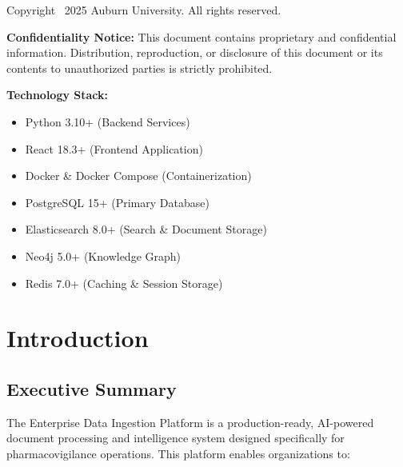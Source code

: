 \documentclass[11pt,a4paper,twoside]{book}
\begin{document}
\noindent
Copyright \textcopyright\ 2025 Auburn University. All rights reserved.

\vspace{1cm}

\noindent
\textbf{Confidentiality Notice:} This document contains proprietary and confidential information. Distribution, reproduction, or disclosure of this document or its contents to unauthorized parties is strictly prohibited.

\vspace{0.5cm}

\noindent
\textbf{Technology Stack:}
\begin{itemize}[noitemsep]
    \item Python 3.10+ (Backend Services)
    \item React 18.3+ (Frontend Application)
    \item Docker \& Docker Compose (Containerization)
    \item PostgreSQL 15+ (Primary Database)
    \item Elasticsearch 8.0+ (Search \& Document Storage)
    \item Neo4j 5.0+ (Knowledge Graph)
    \item Redis 7.0+ (Caching \& Session Storage)
\end{itemize}

\vspace*{\fill}

\tableofcontents
\listoffigures
\listoftables

\chapter{Introduction}

\section{Executive Summary}

The Enterprise Data Ingestion Platform is a production-ready, AI-powered document processing and intelligence system designed specifically for pharmacovigilance operations. This platform enables organizations to:
\end{document}
